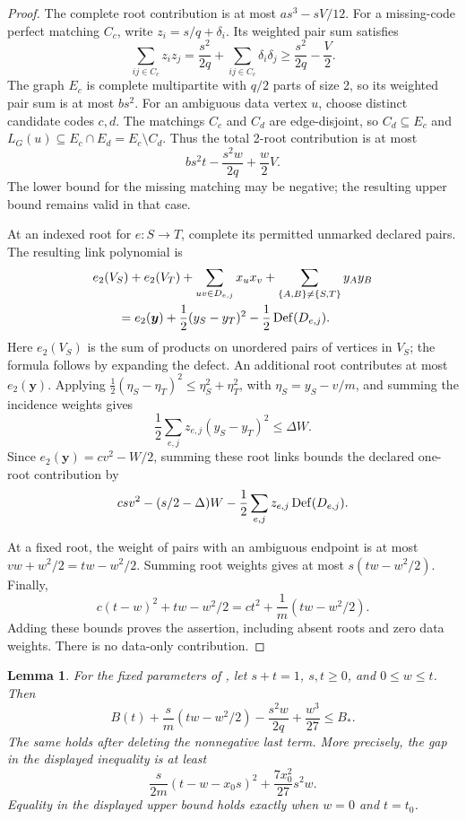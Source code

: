 \documentclass[10pt]{article}
\numberwithin{equation}{section}
\newtheorem{lemma}[lemma]{Lemma}\aliascntresetthe{lemma}
\theoremstyle{definition}
\begin{document}
\begin{proof}
The complete root contribution is at most $as^3-sV/12$. For a missing-code perfect matching $C_c$, write $z_i=s/q+\delta_i$. Its weighted pair sum satisfies
\[
 \sum_{ij\in C_c}z_iz_j
 =\frac{s^2}{2q}+\sum_{ij\in C_c}\delta_i\delta_j
 \ge\frac{s^2}{2q}-\frac V2.
\]
The graph $E_c$ is complete multipartite with $q/2$ parts of size 2, so its weighted pair sum is at most $bs^2$. For an ambiguous data vertex $u$, choose distinct candidate codes $c,d$. The matchings $C_c$ and $C_d$ are edge-disjoint, so $C_d\subseteq E_c$ and $L_G(u)\subseteq E_c\cap E_d=E_c\setminus C_d$. Thus the total 2-root contribution is at most
\[
 bs^2t-\frac{s^2w}{2q}+\frac w2V.
\]
The lower bound for the missing matching may be negative; the resulting upper bound remains valid in that case.

At an indexed root for $e\colon S\to T$, complete its permitted unmarked declared pairs. The resulting link polynomial is
\[
\begin{aligned}
 &e_2(V_S)+e_2(V_T)+\sum_{uv\in D_{e,j}}x_ux_v
       +\sum_{\{A,B\}\ne\{S,T\}}y_Ay_B\\
 &\qquad=e_2(\boldsymbol y)+\frac12(y_S-y_T)^2
                  -\frac12\operatorname{Def}(D_{e,j}).
\end{aligned}
\]
Here $e_2(V_S)$ is the sum of products on unordered pairs of vertices in $V_S$; the formula follows by expanding the defect. An additional root contributes at most $e_2(\boldsymbol y)$. Applying $\tfrac12(\eta_S-\eta_T)^2\le\eta_S^2+\eta_T^2$, with $\eta_S=y_S-v/m$, and summing the incidence weights gives
\[
 \frac12\sum_{e,j}z_{e,j}(y_S-y_T)^2\le\Delta W.
\]
Since $e_2(\boldsymbol y)=cv^2-W/2$, summing these root links bounds the declared one-root contribution by
\[
 csv^2-(s/2-\Delta)W
       -\frac12\sum_{e,j}z_{e,j}\operatorname{Def}(D_{e,j}).
\]

At a fixed root, the weight of pairs with an ambiguous endpoint is at most $vw+w^2/2=tw-w^2/2$. Summing root weights gives at most $s(tw-w^2/2)$. Finally,
\[
 c(t-w)^2+tw-w^2/2
 =ct^2+\frac1m(tw-w^2/2).
\]
Adding these bounds proves the assertion, including absent roots and zero data weights. There is no data-only contribution.
\end{proof}
\begin{lemma}
\label{lem:ternary-ambiguity-short}
For the fixed parameters of , let $s+t=1$, $s,t\ge0$, and $0\le w\le t$. Then
\[
 B(t)+\frac{s}{m}(tw-w^2/2)-\frac{s^2w}{2q}
       +\frac{w^3}{27}\le B_*.
\]
The same holds after deleting the nonnegative last term. More precisely, the gap in the displayed inequality is at least
\[
 \frac{s}{2m}(t-w-x_0s)^2+\frac{7x_0^2}{27}s^2w.
\]
Equality in the displayed upper bound holds exactly when $w=0$ and $t=t_0$.
\end{lemma}
\end{document}
